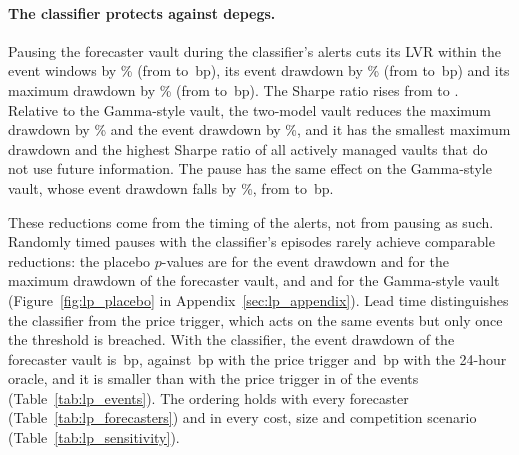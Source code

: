 \paragraph{The classifier protects against depegs.} Pausing the forecaster vault during the classifier's
alerts cuts its LVR within the event windows by \lpFcKEvLVRCut\% (from \lpFcEvLVR{} to \lpFcKEvLVR\,bp),
its event drawdown by \lpFcKEventDDCut\% (from \lpFcEventDD{} to \lpFcKEventDD\,bp) and its maximum
drawdown by \lpFcKMaxDDCut\% (from \lpFcMaxDD{} to \lpFcKMaxDD\,bp). The Sharpe ratio rises from
\lpFcSharpe{} to \lpFcKSharpe. Relative to the Gamma-style vault, the two-model vault reduces the maximum
drawdown by \lpFcKvsGammaMaxDDCut\% and the event drawdown by \lpFcKvsGammaEventDDCut\%, and it has the
smallest maximum drawdown and the highest Sharpe ratio of all actively managed vaults that do not use
future information.
The pause has the same effect on the Gamma-style vault, whose event drawdown falls by \lpGKEventDDCut\%,
from \lpGammaEventDD{} to \lpGKEventDD\,bp.

These reductions come from the timing of the alerts, not from pausing as such. Randomly timed pauses with
the classifier's episodes rarely achieve comparable reductions: the placebo $p$-values are \lpPFcEventDD{} for the event
drawdown and \lpPFcMaxDD{} for the maximum drawdown of the forecaster vault, and \lpPGammaEventDD{} and
\lpPGammaMaxDD{} for the Gamma-style vault (Figure~\ref{fig:lp_placebo} in Appendix~\ref{sec:lp_appendix}).
Lead time distinguishes the classifier from the price trigger, which acts on the same events but only once
the threshold is breached. With the classifier, the event drawdown of the forecaster vault is
\lpFcKEventDD\,bp, against \lpFcPEventDD\,bp with the price trigger and \lpFcOEventDD\,bp with the 24-hour
oracle, and it is smaller than with the price trigger in \lpFcKBetterEvents{} of the \lpNEvents{} events
(Table~\ref{tab:lp_events}). The ordering holds with every forecaster (Table~\ref{tab:lp_forecasters}) and in
every cost, size and competition scenario (Table~\ref{tab:lp_sensitivity}).



